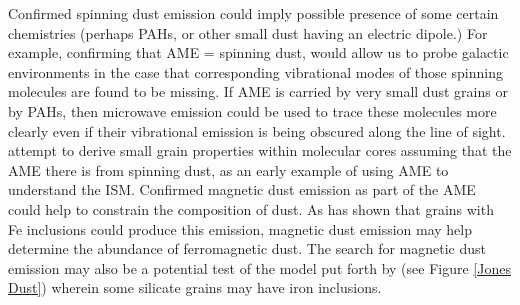      Confirmed spinning dust emission could imply possible presence of some certain chemistries (perhaps PAHs, or other small dust having an electric dipole.) For example, confirming that AME = spinning dust, would allow us to probe galactic environments in the case that corresponding vibrational modes of those spinning molecules are found to be missing. If AME is carried by very small dust grains or by PAHs, then microwave emission could be used to trace these molecules more clearly even if their vibrational emission is being obscured along the line of sight. \cite{tibbs14} attempt to derive small grain properties within molecular cores assuming that the AME there is from spinning dust, as an early example of using AME to understand the ISM. 
     Confirmed magnetic dust emission as part of the AME could help to constrain the composition of dust. As \cite{draine99} has shown that grains with Fe inclusions could produce this emission, magnetic dust emission may help determine the abundance of ferromagnetic dust. The search for magnetic dust emission may also be a potential test of the model put forth by \cite{jones14} (see Figure \ref{Jones Dust}) wherein some silicate grains may have iron inclusions.
\clearpage

